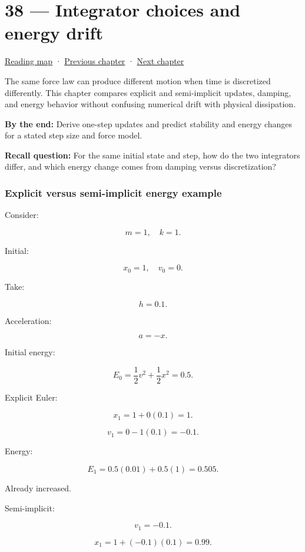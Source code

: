 \hypertarget{06-engine-ii-ch038}{}
\chapter{38 --- Integrator choices and energy drift}\label{06-engine-ii-ch038-integrator-choices-and-energy-drift}

\hyperref[volume-reading-map]{Reading map} · \hyperref[06-engine-ii-ch037]{Previous chapter} · \hyperref[06-engine-ii-ch039]{Next chapter}

The same force law can produce different motion when time is discretized differently. This chapter compares explicit and semi-implicit updates, damping, and energy behavior without confusing numerical drift with physical dissipation.

\textbf{By the end:} Derive one-step updates and predict stability and energy changes for a stated step size and force model.

\textbf{Recall question:} For the same initial state and step, how do the two integrators differ, and which energy change comes from damping versus discretization?

\subsection{Explicit versus semi-implicit energy example}\label{06-engine-ii-ch038-explicit-versus-semi-implicit-energy-example}

Consider:

\[
m=1,\quad k=1.
\]

Initial:

\[
x_0=1,\quad v_0=0.
\]

Take:

\[
h=0.1.
\]

Acceleration:

\[
a=-x.
\]

Initial energy:

\[
E_0
=
\frac12v^2+
\frac12x^2
=
0.5.
\]

Explicit Euler:

\[
x_1=1+0(0.1)=1.
\]

\[
v_1=0-1(0.1)=-0.1.
\]

Energy:

\[
E_1
=
0.5(0.01)
+
0.5(1)
=
0.505.
\]

Already increased.

Semi-implicit:

\[
v_1=-0.1.
\]

\[
x_1=1+(-0.1)(0.1)=0.99.
\]

